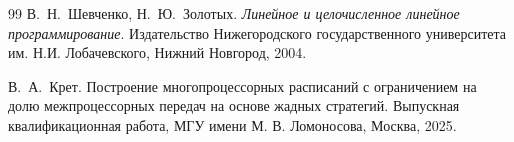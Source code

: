 {\begin{thebibliography}{99}
	В.~Н.~Шевченко, Н.~Ю.~Золотых.
	\newblock \emph{Линейное и целочисленное линейное программирование}.
	\newblock Издательство Нижегородского государственного университета им. Н.И. Лобачевского, Нижний Новгород, 2004.
	
	В.~А.~Крет.
	\newblock Построение многопроцессорных расписаний с ограничением на долю межпроцессорных передач на основе жадных стратегий.
	\newblock Выпускная квалификационная работа, МГУ имени М. В. Ломоносова, Москва, 2025.
	
\end{thebibliography}
}
\normalsize
